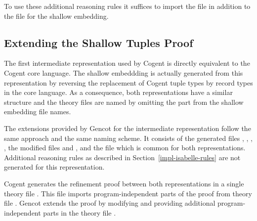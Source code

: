 To use these additional reasoning rules it suffices to import the file  in addition to
the file  for the shallow embedding.

\subsection{Extending the Shallow Tuples Proof}
\label{impl-isabelle-reftuples}

The first intermediate representation used by Cogent is directly equivalent to the Cogent core language. The shallow 
embeddding is actually generated from this representation by reversing the replacement of Cogent tuple types by record types
in the core language. As a consequence, both representations have a similar structure and the theory files are named
by omitting the  part from the shallow embedding file names.

The extensions provided by Gencot for the intermediate representation follow the same approach and the same naming scheme.
It consists of the generated files , , , 
, the modified files  and , 
and the file  which is common for both representations. Additional reasoning rules as described
in Section~\ref{impl-isabelle-rules} are not generated for this representation.

Cogent generates the refinement proof between both representations in a single theory file .
This file imports program-independent parts of the proof from theory file . Gencot extends the 
proof by modifying  and providing additional program-independent parts in the theory 
file .
